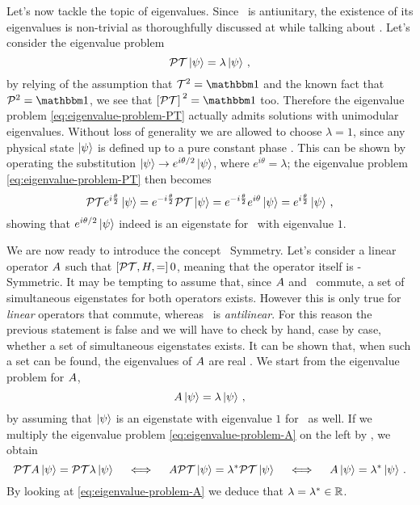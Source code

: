         Let's now tackle the topic of eigenvalues. Since \hPT\ is antiunitary, the existence of its eigenvalues is non-trivial as thoroughfully discussed at  while talking about \hT. Let's consider the eigenvalue problem
        \begin{equation}
            \label{eq:eigenvalue-problem-PT}
            \mathcal{{P}}\mathcal{{T}} \ket{\psi} = \lambda \ket{\psi}
            \,\text{,}
        \end{equation}
        by relying of the assumption that $\hT^2 = \togglehat{\idM}$ and the known fact that $\hP^2 = \togglehat{\idM}$, we see that $\bqty*{\hPT}^2 = \togglehat{\idM}$ too. Therefore the eigenvalue problem \eqref{eq:eigenvalue-problem-PT} actually admits solutions with unimodular eigenvalues. Without loss of generality we are allowed to choose $\lambda = 1$, since any physical state $\ket{\psi}$ is defined up to a pure constant phase \cite{Bender2005}. This can be shown by operating the substitution $\ket{\psi} \rightarrow e^{i\theta / 2}\ket{\psi}$, where $e^{i\theta} = \lambda$; the eigenvalue problem \eqref{eq:eigenvalue-problem-PT} then becomes
        \begin{equation*}
            \mathcal{{P}}\mathcal{{T}} e^{i\frac{\theta}{2}} \ket{\psi} = e^{-i\frac{\theta}{2}} \mathcal{{P}}\mathcal{{T}} \ket{\psi} = e^{-i\frac{\theta}{2}} e^{i\theta} \ket{\psi} = e^{i\frac{\theta}{2}} \ket{\psi}
            \,\text{,}
        \end{equation*}
        showing that $e^{i\theta / 2}\ket{\psi}$ indeed is an eigenstate for \hPT\ with eigenvalue $1$.

        We are now ready to introduce the concept \PT\ Symmetry. Let's consider a linear operator ${A}$ such that $\comm*{\hPT, H} = 0$, meaning that the operator itself is \PT-Symmetric. It may be tempting to assume that, since ${A}$ and \hPT\ commute, a set of simultaneous eigenstates for both operators exists. However this is only true for \emph{linear} operators that commute, whereas \hPT\ is \emph{antilinear}. For this reason the previous statement is false \cite{bender2024} and we will have to check by hand, case by case, whether a set of simultaneous eigenstates exists. It can be shown that, when such a set can be found, the eigenvalues of ${A}$ are real \cite{bender2024}. We start from the eigenvalue problem for ${A}$,
        \begin{equation}
            \label{eq:eigenvalue-problem-A}
            {A} \ket{\psi} = \lambda \ket{\psi}
            \,\text{,}
        \end{equation}
        by assuming that $\ket{\psi}$ is an eigenstate with eigenvalue $1$ for \hPT\ as well. If we multiply the eigenvalue problem \eqref{eq:eigenvalue-problem-A} on the left by \hPT, we obtain
        \begin{equation*}
            \mathcal{{P}}\mathcal{{T}} {A} \ket{\psi} = \mathcal{{P}}\mathcal{{T}} \lambda \ket{\psi}
            \quad\iff\quad
            {A} \mathcal{{P}}\mathcal{{T}} \ket{\psi} = \lambda^* \mathcal{{P}}\mathcal{{T}} \ket{\psi}
            \quad\iff\quad
            {A} \ket{\psi} = \lambda^* \ket{\psi}
            \,\text{.}
        \end{equation*}
        By looking at \eqref{eq:eigenvalue-problem-A} we deduce that $\lambda = \lambda^* \in \mathbb{R}$.

